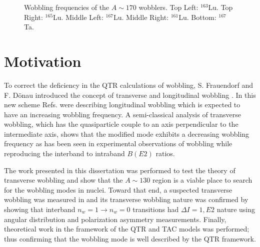 \begin{figure}[ht!]
	\caption{Wobbling frequencies of the $A\sim{}170$ wobblers. Top Left: $^{163}$Lu. Top Right: $^{165}$Lu. Middle Left: $^{167}$Lu. Middle Right: $^{161}$Lu. Bottom: $^{167}$Ta.\label{fig:chp1-old-wobb-freq}}
\end{figure}

\section{Motivation}
\label{ssec:intro-rot-motivation}
To correct the deficiency in the QTR calculations of wobbling, S. Frauendorf and F. D\"{o}nau introduced the concept of transverse and longitudinal wobbling \cite{frauendorfTransverseWobbling}. In this new scheme Refs. \cite{oldQTRWobblingTheory1,oldQTRWobblingTheory2,oldQTRWobblingTheory3,oldQTRWobblingTheory4} were describing longitudinal wobbling which is expected to have an increasing wobbling frequency. A semi-classical analysis of transverse wobbling, which has the quasiparticle couple to an axis perpendicular to the intermediate axis, shows that the modified mode exhibits a decreasing wobbling frequency as has been seen in experimental observations of wobbling while reproducing the interband to intraband $B(E2)$ ratios.

The work presented in this dissertation was performed to test the theory of transverse wobbling and show that the $A\sim{}130$ region is a viable place to search for the wobbling modes in nuclei. Toward that end, a suspected transverse wobbling was measured in \pr{} and its transverse wobbling nature was confirmed by showing that interband $n_w=1\rightarrow{}n_w=0$ transitions had $\Delta{}I=1, E2$ nature using angular distribution and polarization asymmetry measurements. Finally, theoretical work in the framework of the QTR and TAC models was performed; thus confirming that the wobbling mode is well described by the QTR framework.
